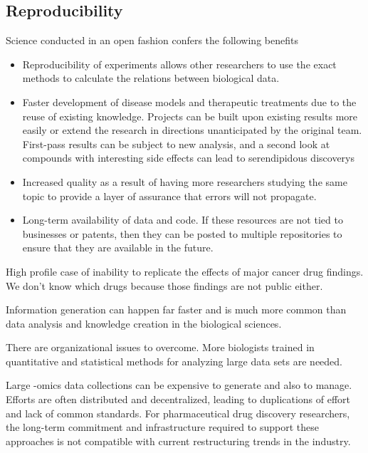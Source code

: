 \subsection{Reproducibility}

Science conducted in an open fashion confers the following benefits

\begin{itemize}

\item Reproducibility of experiments allows other researchers to use the exact methods to calculate the relations between biological data.

\item Faster development of disease models and therapeutic treatments due to the reuse of existing knowledge. Projects can be built upon existing results more easily or extend the research in directions unanticipated by the original team. First-pass results can be subject to new analysis, and a second look at compounds with interesting side effects can lead to serendipidous discoverys

\item Increased quality as a result of having more researchers studying the same topic to provide a layer of assurance that errors will not propagate.

\item Long-term availability of data and code. If these resources are not tied to businesses or patents, then they can be posted to multiple repositories to ensure that they are available in the future.
\cite{Prlic2012}

\end{itemize}

High profile case of inability to replicate the effects of major cancer drug findings. \cite{} We don't know which drugs because those findings are not public either.

Information generation can happen far faster and is much more common than data analysis and knowledge creation in the biological sciences.

There are organizational issues to overcome. More biologists trained in quantitative and statistical methods for analyzing large data sets are needed. 

Large -omics data collections can be expensive to generate and also to manage. Efforts are often distributed and decentralized, leading to duplications of effort and lack of common standards. For pharmaceutical drug discovery researchers, the long-term commitment and infrastructure required to support these approaches is not compatible with current restructuring trends in the industry.\cite{Berg2014}

